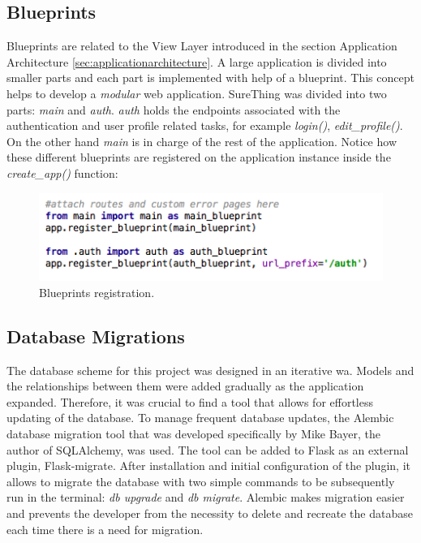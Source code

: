 \subsection{Blueprints}
\label{subsec:blueprints}
Blueprints are related to the View Layer introduced in the section Application Architecture \ref{sec:applicationarchitecture}. A large application is divided into smaller parts and each part is implemented with help of a blueprint. This concept helps to develop a \emph{modular} web application. SureThing was divided into two parts: \emph{main} and \emph{auth}. \emph{auth} holds the endpoints associated with the authentication and user profile related tasks, for example \emph{login()}, \emph{edit\_profile()}. On the other hand \emph{main} is in charge of the rest of the application. Notice how these different blueprints are registered on the application instance inside the \emph{create\_app()} function:

\begin{figure}[H]
	\begin{center}
		\includegraphics[width=.50\textwidth]{impl/images/blueprintsRegistration}
		\caption{Blueprints registration.} \label{fig:using:blueprintsregistration}
	\end{center}
\end{figure}

\subsection{Database Migrations}
\label{subsec:databasemigrations}
The database scheme for this project was designed in an iterative wa. Models and the relationships between them were added gradually as the application expanded. Therefore, it was crucial to find a tool that allows for effortless updating of the database. To manage frequent database updates, the Alembic database migration tool that was developed specifically by Mike Bayer, the author of SQLAlchemy, was used. The tool can be added to Flask as an external plugin, Flask-migrate. After installation and initial configuration of the plugin, it allows to migrate the database with two simple commands to be subsequently run in the terminal: \emph{db upgrade} and \emph{db migrate}. Alembic makes migration easier and prevents the developer from the necessity to delete and recreate the database each time there is a need for migration.

